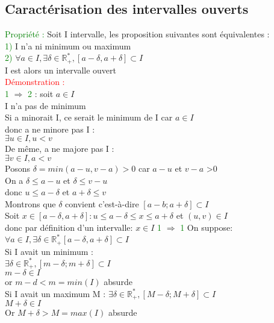 \documentclass{article}
\begin{document}
	\subsection{Caractérisation des intervalles ouverts}
	\textcolor{green}{Propriété :} Soit I intervalle, les proposition suivantes sont équivalentes : \\ 
	\textcolor{green}{1)} I n'a ni minimum ou maximum \\ 
	\textcolor{green}{2)} $\forall a \in I, \exists \delta \in \mathbb{R}^*_+, [a- \delta , a+\delta] \subset I$ \\ 
	I est alors un intervalle ouvert \\
	\textcolor{red}{Démonstration :} \\ 
	\textcolor{green}{1} $\Rightarrow$ \textcolor{green}{2} : soit $a \in I$ \\ 
	I n'a pas de minimum \\  
	Si a minorait I, ce serait le minimum de I car $a \in I$ \\ 
	donc a ne minore pas I : \\ 
	$\exists u \in I, u<v$ \\ 
	De même, a ne majore pas I : \\ 
	$\exists v \in I , a<v$ \\ 
	Posons $\delta = min(a-u,v-a)>0$ car $a-u$ et $v-a$ >0 \\ 
	On a $\delta \leq a-u$ et $\delta \leq v-u$ \\ 
	donc $u \leq a- \delta$ et $a+ \delta \leq v$ \\ 
	Montrons que $\delta$ convient c'est-à-dire $[a-b;a+\delta] \subset I$ \\ 
	Soit $x \in [a- \delta , a+ \delta] : u \leq a-\delta \leq x \leq a+ \delta$ et $(u,v) \in I$ \\ 
	donc par définition d'un intervalle: $x \in I$
	\textcolor{green}{1} $\Rightarrow$ \textcolor{green}{1} On suppose: $\forall a \in I, \exists \delta \in \mathbb{R}^*_+ [a-\delta, a+ \delta] \subset I$ \\ 
	Si I avait un minimum : \\ 
	$\exists \delta \in \mathbb{R}^*_+,[m-\delta ; m+ \delta] \subset I$ \\ 
	$m- \delta \in I$ \\ 
	or $m-d < m=min(I)$ absurde \\ 
	Si I avait un maximum M :
	$\exists \delta \in \mathbb{R}^*_+,[M-\delta ; M+ \delta] \subset I$ \\ 
	$M+ \delta \in I$ \\ 
	Or $M+ \delta > M=max(I)$ absurde
\end{document}
